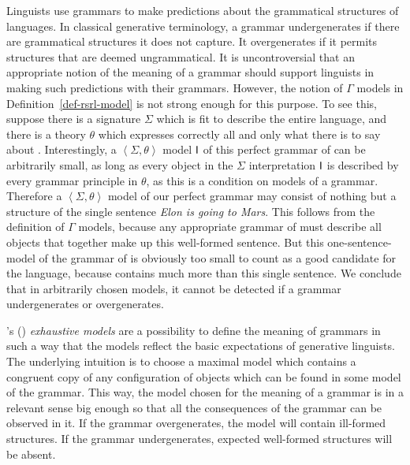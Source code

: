 \documentclass[output=paper
 	        ,biblatex
                ,babelshorthands
                ,newtxmath
                ,draftmode
                ,colorlinks, citecolor=brown
]{langscibook}
\begin{document}
{%


Linguists use grammars to make predictions about the grammatical
structures of languages. In classical generative terminology, a
grammar undergenerates if there are grammatical structures it does not
capture. It overgenerates if it permits structures that are deemed
ungrammatical. It is uncontroversial that an appropriate notion of the
meaning of a grammar should support linguists in making such
predictions with their grammars. However, the notion of $\Gamma$
models in Definition~\ref{def-rsrl-model} is not strong enough for
this purpose. To see this, suppose there is a signature $\Sigma$ which
is fit to describe the entire  language, and there is a theory
$\theta$ which expresses correctly all and only what there is to say
about .  Interestingly, a $\left< \Sigma, \theta \right>$ model
$\mathsf{I}$ of this perfect grammar of  can be arbitrarily small, as
long as every object in the $\Sigma$ interpretation $\mathsf{I}$ is
described by every grammar principle in $\theta$, as this is a condition
on models of a grammar. Therefore a $\left< \Sigma, \theta \right>$
model of our perfect grammar may consist of nothing but a structure of
the single sentence \emph{Elon is going to Mars}. This follows from
the definition of $\Gamma$ models, because any appropriate grammar of
 must describe all objects that together make up this
well-formed sentence.  But this one-sentence-model of the grammar of
 is obviously too small to count as a good candidate for
the  language, because  contains much more than this
single sentence. We conclude that in arbitrarily chosen models, it
cannot be detected if a grammar undergenerates or overgenerates.


\citeauthor{King99a-u}'s (\citeyear{King99a-u}) \emph{exhaustive models} are a possibility to
define the meaning of grammars in such a way that the models reflect the
basic expectations of generative linguists. The underlying intuition
is to choose a maximal model which contains a congruent copy of any
configuration of objects which can be found in some model of the grammar.
This way, the model chosen for the meaning of a grammar is in a
relevant sense big enough so that all
the consequences of the grammar can be observed in it. If the grammar
overgenerates, the model will contain ill-formed structures. If the grammar
undergenerates, expected well-formed structures will be absent.

}
\end{document}
